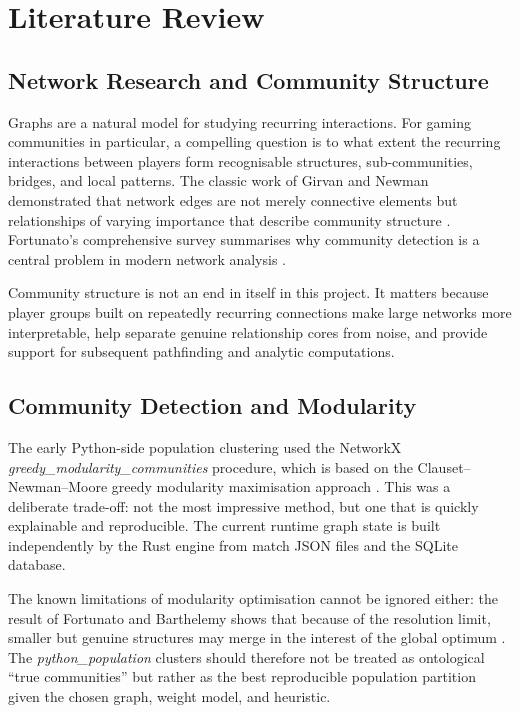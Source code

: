 \chapter{Literature Review}

\section{Network Research and Community Structure}

Graphs are a natural model for studying recurring interactions. For gaming communities in particular, a compelling question is to what extent the recurring interactions between players form recognisable structures, sub-communities, bridges, and local patterns. The classic work of Girvan and Newman demonstrated that network edges are not merely connective elements but relationships of varying importance that describe community structure \cite{girvannewman}. Fortunato's comprehensive survey summarises why community detection is a central problem in modern network analysis \cite{fortunato2010}.

Community structure is not an end in itself in this project. It matters because player groups built on repeatedly recurring connections make large networks more interpretable, help separate genuine relationship cores from noise, and provide support for subsequent pathfinding and analytic computations.

\section{Community Detection and Modularity}

The early Python-side population clustering used the NetworkX \textit{greedy\_modularity\_communities} procedure, which is based on the Clauset--Newman--Moore greedy modularity maximisation approach \cite{clauset2004,networkx_greedy}. This was a deliberate trade-off: not the most impressive method, but one that is quickly explainable and reproducible. The current runtime graph state is built independently by the Rust engine from match JSON files and the SQLite database.

The known limitations of modularity optimisation cannot be ignored either: the result of Fortunato and Barthelemy shows that because of the resolution limit, smaller but genuine structures may merge in the interest of the global optimum \cite{fortunato_barthelemy2007}. The \textit{python\_population} clusters should therefore not be treated as ontological ``true communities'' but rather as the best reproducible population partition given the chosen graph, weight model, and heuristic.

